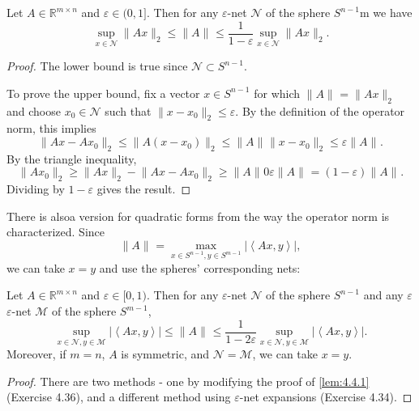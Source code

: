 \begin{lemma}
\label{lem:4.4.1}
Let $A \in \mathbb{R}^{m \times n}$ and $\varepsilon \in (0, 1]$. Then for any $\varepsilon$-net $\mathcal{N}$ 
of the sphere $S^{n - 1}$m we have 
\[ \sup_{x \in \mathcal{N}} \lVert Ax \rVert_{2} \leq \lVert A \rVert_{} 
\leq \frac{1}{1 - \varepsilon} \sup_{x \in \mathcal{N}} \lVert Ax \rVert_{2}. \]
\end{lemma}

\begin{proof}
The lower bound is true since $\mathcal{N} \subset S^{n - 1}$. 

To prove the upper bound, fix a vector $x \in S^{n - 1}$ for which $\lVert A \rVert_{} = \lVert Ax \rVert_{2}$ 
and choose $x_0 \in \mathcal{N}$ such that $\lVert x - x_0 \rVert_{2} \leq \varepsilon$. By the definition 
of the operator norm, this implies 
\[ \lVert Ax - Ax_0 \rVert_{2} \leq \lVert A(x - x_0) \rVert_{2} 
\leq \lVert A \rVert_{} \lVert x - x_0 \rVert_{2} \leq \varepsilon \lVert A \rVert_{}. \]
By the triangle inequality, 
\[ \lVert Ax_0 \rVert_{2} \geq \lVert Ax \rVert_{2} - \lVert Ax - Ax_0 \rVert_{2} 
\geq \lVert A \rVert_{} 0 \varepsilon \lVert A \rVert_{} = (1 - \varepsilon)\lVert A \rVert_{}. \]
Dividing by $1 - \varepsilon$ gives the result.
\end{proof}

There is alsoa version for quadratic forms from the way the operator norm is characterized. Since 
\[ \lVert A \rVert_{} = \max_{x \in S^{n - 1}, y \in S^{m - 1}} 
|\left\langle Ax, y \right\rangle|, \]
we can take $x = y$ and use the spheres' corresponding nets:

\begin{lemma}
\label{lem:4.4.2}
Let $A \in \mathbb{R}^{m \times n}$ and $\varepsilon \in [0, 1)$. Then for any $\varepsilon$-net $\mathcal{N}$ 
of the sphere $S^{n - 1}$ and any $\varepsilon$ $\varepsilon$-net $\mathcal{M}$ of the sphere $S^{m - 1}$, 
\[ \sup_{x \in \mathcal{N}, y \in \mathcal{M}} |\left\langle Ax, y \right\rangle| 
\leq \lVert A \rVert_{} \leq \frac{1}{1 - 2 \varepsilon} \sup_{x \in \mathcal{N}, y \in \mathcal{M}} 
|\left\langle Ax, y \right\rangle|. \]
Moreover, if $m = n$, $A$ is symmetric, and $\mathcal{N} = \mathcal{M}$, we can take $x = y$.
\end{lemma}

\begin{proof}
There are two methods - one by modifying the proof of \cref{lem:4.4.1} (Exercise 4.36), and a different method 
using $\varepsilon$-net expansions (Exercise 4.34).
\end{proof}

